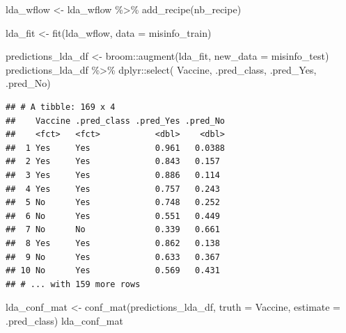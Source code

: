 \documentclass[
]{article}
\newenvironment{Shaded}{\begin{snugshade}}{\end{snugshade}}
\newcommand{\AttributeTok}[1]{\textcolor[rgb]{0.77,0.63,0.00}{#1}}
\newcommand{\FunctionTok}[1]{\textcolor[rgb]{0.00,0.00,0.00}{#1}}
\newcommand{\NormalTok}[1]{#1}
\newcommand{\OtherTok}[1]{\textcolor[rgb]{0.56,0.35,0.01}{#1}}
\newcommand{\SpecialCharTok}[1]{\textcolor[rgb]{0.00,0.00,0.00}{#1}}
\begin{document}
\begin{Shaded}
\begin{Highlighting}[]
\NormalTok{lda\_wflow }\OtherTok{\textless{}{-}}\NormalTok{ lda\_wflow }\SpecialCharTok{\%\textgreater{}\%}
  \FunctionTok{add\_recipe}\NormalTok{(nb\_recipe)}
\end{Highlighting}
\end{Shaded}

\begin{Shaded}
\begin{Highlighting}[]
\NormalTok{lda\_fit }\OtherTok{\textless{}{-}} \FunctionTok{fit}\NormalTok{(lda\_wflow, }\AttributeTok{data =}\NormalTok{ misinfo\_train)}
\end{Highlighting}
\end{Shaded}

\begin{Shaded}
\begin{Highlighting}[]
\NormalTok{predictions\_lda\_df }\OtherTok{\textless{}{-}}\NormalTok{ broom}\SpecialCharTok{::}\FunctionTok{augment}\NormalTok{(lda\_fit, }\AttributeTok{new\_data =}\NormalTok{ misinfo\_test)}
\NormalTok{predictions\_lda\_df }\SpecialCharTok{\%\textgreater{}\%}\NormalTok{ dplyr}\SpecialCharTok{::}\FunctionTok{select}\NormalTok{(}
\NormalTok{  Vaccine, }
\NormalTok{  .pred\_class, }
\NormalTok{  .pred\_Yes, }
\NormalTok{  .pred\_No)}
\end{Highlighting}
\end{Shaded}

\begin{verbatim}
## # A tibble: 169 x 4
##    Vaccine .pred_class .pred_Yes .pred_No
##    <fct>   <fct>           <dbl>    <dbl>
##  1 Yes     Yes             0.961   0.0388
##  2 Yes     Yes             0.843   0.157 
##  3 Yes     Yes             0.886   0.114 
##  4 Yes     Yes             0.757   0.243 
##  5 No      Yes             0.748   0.252 
##  6 No      Yes             0.551   0.449 
##  7 No      No              0.339   0.661 
##  8 Yes     Yes             0.862   0.138 
##  9 No      Yes             0.633   0.367 
## 10 No      Yes             0.569   0.431 
## # ... with 159 more rows
\end{verbatim}

\begin{Shaded}
\begin{Highlighting}[]
\NormalTok{lda\_conf\_mat }\OtherTok{\textless{}{-}} \FunctionTok{conf\_mat}\NormalTok{(predictions\_lda\_df, }\AttributeTok{truth =}\NormalTok{ Vaccine, }\AttributeTok{estimate =}\NormalTok{ .pred\_class)}
\NormalTok{lda\_conf\_mat}
\end{Highlighting}
\end{Shaded}
\end{document}
